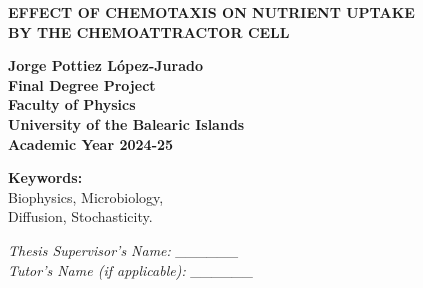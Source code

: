 \begin{titlepage}
    {
    \selectfont
    \raggedright
    \vspace*{17mm}
    \hspace{1cm}\LARGE\textbf{
        EFFECT OF CHEMOTAXIS ON NUTRIENT UPTAKE \\ 
        \hspace{1cm} BY THE CHEMOATTRACTOR CELL}\\
    \vspace{29mm}

    \hspace{10mm}\LARGE\textbf{Jorge Pottiez López-Jurado}\\
    \vspace{7mm}
    \hspace{1cm}\LARGE\textbf{Final Degree Project}\\
    \vspace{7mm}
    \hspace{1cm}\Large\textbf{Faculty of Physics}\\
    \vspace{7mm}
    \hspace{1cm}\Large\textbf{University of the Balearic Islands}\\
    \vspace{7mm}
    \hspace{1cm}\normalsize\textbf{Academic Year 2024-25}\\
    \vspace{17mm}

    \hspace{1cm}\small\textbf{Keywords:}\\
    \vspace{3mm}
    \hspace{1cm}\small Biophysics, Microbiology, \\
    \hspace{1cm}\small Diffusion, Stochasticity.\\
    \vspace{25mm}

    \hspace{1cm}\large\textit{Thesis Supervisor's Name: \_\_\_\_\_\_}\\
    \vspace{1cm}
    \hspace{1cm}\large\textit{Tutor's Name (if applicable): \_\_\_\_\_\_}\\
    
}
\end{titlepage}
